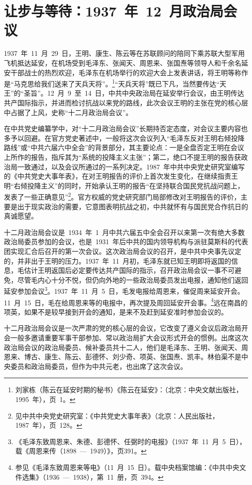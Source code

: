 \section{让步与等待：1937~年~12~月政治局会议}

1937~年~11~月~29~日，王明、康生、陈云等在苏联顾问的陪同下乘苏联大型军用飞机抵达延安，在机场受到毛泽东、张闻天、周恩来、张国焘等领导人和千余名延安干部战士的热烈欢迎，毛泽东在机场举行的欢迎大会上发表讲话，将王明等称作是“马克思给我们送来了天兵天将”。\footnote{刘家栋（陈云在延安时期的秘书）《陈云在延安》：（北京：中央文献出版社，1995~年），页~1。}“天兵天将”既已下凡，当然要传达“天王”的“圣旨”。12~月~9~至~14~日，中共中央政治局在延安举行会议，由王明传达共产国际指示，并进而检讨抗战以来党的路线，此次会议王明的主张在党的核心层中占据了上风，史称“十二月政治局会议”。

在中共党史编纂学中，对“十二月政治局会议”长期持否定态度，对会议主要内容也多予以回避。在官方党史著述中，一般将这次会议列入“毛泽东反对王明右倾投降路线”或“中共六届六中全会”的背景部分，其主要论点：一是全盘否定王明在会议上所作的报告，指斥其为“系统的投降主义主张”；第二，绝口不提王明的报告获政治局一致通过，以及会议所通过的一系列决定。1987~年中共中央党史研究室编写的《中共党史大事年表》，在对王明报告的评价上首次发生变化，在继续指责王明“右倾投降主义”的同时，开始承认王明的报告“在坚持联合国民党抗战问题上，发表了一些正确意见”\footnote{见中共中央党史研究室：《中共党史大事年表》（北京：人民出版社，1987~年），页~128。}。官方权威的党史研究部门局部修改对王明报告的评价，主要是出于现实政治的需要，它意图表明抗战之初，中共就怀有与国民党合作抗日的真诚愿望。

十二月政治局会议是~1934~年~1~月中共六届五中全会召开以来第一次有绝大多数政治局委员参加的会议，也是~1931~年后中共的国内领导机构与派驻莫斯科的代表团实现汇合后召开的第一次会议。这次政治局会议的召开，是中共中央事先议定的，并非出于王明的压力。1937~年~11~月初，毛泽东就已知王明即将返国的信息，毛估计王明返国后必定要传达共产国际的指示，召开政治局会议一事不可避免，尽管毛内心十分不悦，但仍向外地的一些政治局委员发出电报，通知他们返回延安参加会议\footnote{《毛泽东致周恩来、朱德、彭德怀、任弼时的电报》（1937~年~11~月~5~日），载《周恩来传（1898~—~1949）》，页391。}。1937~年~11~月~5~日，毛发电报给周恩来，催促周来延安开会。11~月~15~日，毛在给周恩来等的电报中，再次提及周回延安开会事。\footnote{参见《毛泽东致周恩来等电》（11~月~15~日）。载中央档案馆编：《中共中央文件选集》（1936~—~1938），第~11~册，页~394。}远在南昌的项英，如果不是较早接到开会的通知，是来不及赶到延安准时参加会议的。

十二月政治局会议是一次严肃的党的核心层的会议，它改变了遵义会议后政治局开会一般多邀请重要军事干部参加、常以政治局扩大会议形式开会的惯例。出席这次政治局会议的政治局委员、候补委员共十二人，他们是毛泽东、王明、张闻天、周恩来、博古、康生、陈云、彭德怀、刘少奇、项英、张国焘、凯丰。林伯渠不是中央委员和政治局委员，但作为中共元老，也出席了这次会议。

